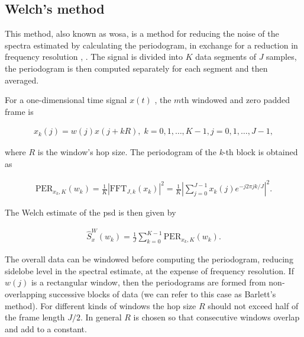 	
	
	
	\subsection{Welch's method}
	
	This method, also known as \gls{wosa}, is a method for reducing the noise of the spectra estimated by calculating the periodogram, in exchange for a reduction in frequency resolution \cite{Welch_period}, \cite{Spagnolini_ch14}.
	The signal is divided into $K$ data segments of $J$ samples, the periodogram is then computed separately for each segment and then averaged.
	
	For a one-dimensional time signal $x(t)$ \cite{SASPWEB2011}, the $m$th windowed and zero padded frame is
	
	\begin{align}
		x_k(j) = w(j)x(j + kR), \; k=0,1,\ldots, K-1, j=0,1,\ldots, J-1,
	\end{align}
	
	where $R$ is the window's hop size. The periodogram of the \textit{k}-th block is obtained as
	
	\begin{align}
		\text{PER}_{x_k,K}(w_k) = \frac{1}{K} |\text{FFT}_{J,k}(x_k)|^2 = \frac{1}{K}\left|\sum_{j=0}^{J-1}x_k(j)e^{-j2\pi jk/J}\right|^2.
	\end{align}
	
	The Welch estimate of the \gls{psd} is then given by
	
	\begin{align}
		\hat{S}^W_x(w_k) = \frac{1}{J}\sum_{k=0}^{K-1}\text{PER}_{x_k,K}(w_k).
	\end{align}
	
	The overall data can be windowed before computing the periodogram, reducing sidelobe level in the spectral estimate, at the expense of frequency resolution. If $w(j)$ is a rectangular window, then the periodograms are formed from non-overlapping successive blocks of data (we can refer to this case as Barlett's method). For different kinds of windows the hop size $R$ should not exceed half of the frame length $J/2$. In general $R$ is chosen so that consecutive windows overlap and add to a constant.
	
	
	

	

    
    
    